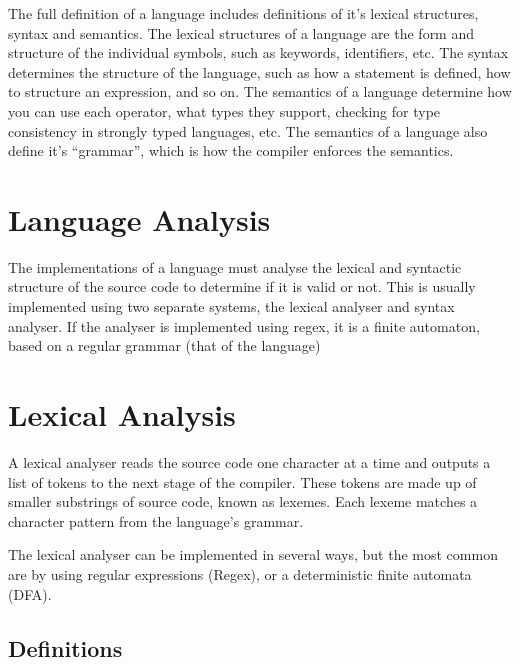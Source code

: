 
The full definition of a language includes definitions of it's lexical structures, syntax and semantics. The lexical
 structures of a language are the form and structure of the individual symbols, such as keywords, identifiers, etc. The
 syntax determines the structure of the language, such as how a statement is defined, how to structure an expression,
 and so on. The semantics of a language determine how you can use each operator, what types they support, checking for
 type consistency in strongly typed languages, etc. The semantics of a language also define it's ``grammar'', which is
 how the compiler enforces the semantics.

\section*{Language Analysis}

The implementations of a language must analyse the lexical and syntactic structure of the source code to determine
 if it is valid or not. This is usually implemented using two separate systems, the lexical analyser and syntax
 analyser. If the analyser is implemented using regex, it is a finite automaton, based on a regular grammar (that of
 the language)

\section*{Lexical Analysis}

A lexical analyser reads the source code one character at a time and outputs a list of tokens to the next stage of the
 compiler. These tokens are made up of smaller substrings of source code, known as lexemes. Each lexeme matches a
 character pattern from the language's grammar.

The lexical analyser can be implemented in several ways, but the most common are by using regular expressions (Regex),
 or a deterministic finite automata (DFA).

\subsection*{Definitions}

